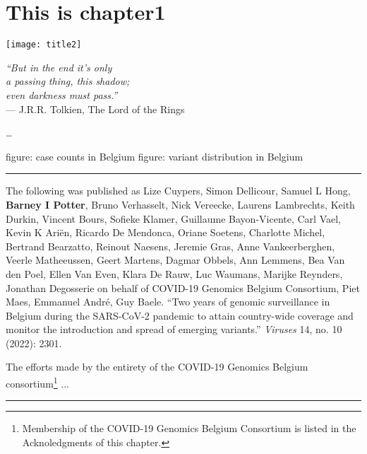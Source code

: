 \chapter{This is chapter1}\label{ch:chapter1}

\begin{minipage}[b]{0.6\textwidth}
    \texttt{[image: title2]} %
  \end{minipage}
  \hfill
  \begin{minipage}[b]{0.35\textwidth}
    \footnotesize
    \begin{flushright}
      \textit{``But in the end it's only\\a passing thing, this shadow;\\even darkness must pass.''} \\
      --- J.R.R. Tolkien, The Lord of the Rings
    \end{flushright}
    \vspace{2cm}
  \end{minipage}
  
  \clearpage
\ldots


figure: case counts in Belgium
figure: variant distribution in Belgium


\hrule
\vspace*{12pt}
The following was published as Lize Cuypers, Simon Dellicour, Samuel L Hong, \textbf{Barney I Potter}, Bruno Verhasselt, Nick Vereecke, Laurens Lambrechts, Keith Durkin, Vincent Bours, Sofieke Klamer, Guillaume Bayon-Vicente, Carl Vael, Kevin K Ariën, Ricardo De Mendonca, Oriane Soetens, Charlotte Michel, Bertrand Bearzatto, Reinout Naesens, Jeremie Gras, Anne Vankeerberghen, Veerle Matheeussen, Geert Martens, Dagmar Obbels, Ann Lemmens, Bea Van den Poel, Ellen Van Even, Klara De Rauw, Luc Waumans, Marijke Reynders, Jonathan Degosserie on behalf of COVID-19 Genomics Belgium Consortium, Piet Maes, Emmanuel André, Guy Baele. ``Two years of genomic surveillance in Belgium during the SARS-CoV-2 pandemic to attain country-wide coverage and monitor the introduction and spread of emerging variants.'' \textit{Viruses} 14, no. 10 (2022): 2301.

The efforts made by the entirety of the COVID-19 Genomics Belgium consortium\footnote{Membership of the COVID-19 Genomics Belgium Consortium is listed in the Acknoledgments of this chapter.} ...
\vspace*{12pt}
\hrule

